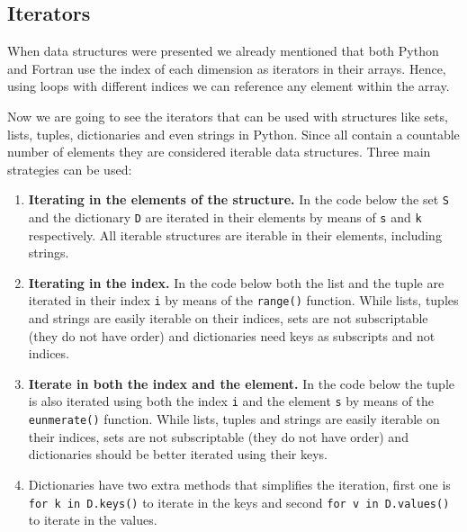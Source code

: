         \newpage
        \subsection{Iterators}
        
        When data structures were presented we already mentioned that both Python and Fortran 
        use the index of each dimension as iterators in their arrays. 
        Hence, using loops with different indices we can reference any element within the array.
        
        Now we are going to see the iterators that can be used with structures like 
        sets, lists, tuples, dictionaries and even strings in Python.    
        Since all contain a countable number of elements they are considered iterable data structures. 
        Three main strategies can be used:
        \begin{enumerate}
            \item \textbf{Iterating in the elements of the structure.} 
            In the code below the set \texttt{S} and the dictionary \texttt{D} are iterated in their elements
            by means of \texttt{s} and \texttt{k} respectively. 
            All iterable structures are iterable in their elements, including strings.  
            \item \textbf{Iterating in the index.}
            In the code below both the list and the tuple are iterated in their index \texttt{i} by means of the \texttt{range()} function.
            While lists, tuples and strings are easily iterable on their indices, 
            sets are not subscriptable (they do not have order) and 
            dictionaries need keys as subscripts and not indices. 
            \item \textbf{Iterate in both the index and the element.} 
            In the code below the tuple is also iterated using both the index \texttt{i} and the element \texttt{s} 
            by means of the \texttt{eunmerate()} function.
            While lists, tuples and strings are easily iterable on their indices, 
            sets are not subscriptable (they do not have order) and 
            dictionaries should be better iterated using their keys.
            
            \item Dictionaries have two extra methods that simplifies the iteration, first one is 
            \texttt{for k in D.keys()} to iterate in the keys 
            and second \texttt{for v in D.values()} to iterate in the values. 
        \end{enumerate} 
        
